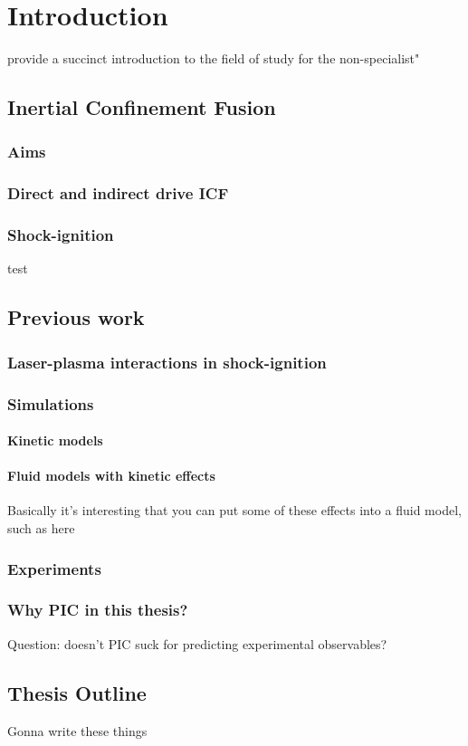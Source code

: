 \chapter{Introduction}
\label{chp:introduction}
provide a succinct introduction to the field of study for the non-specialist"

\section{Inertial Confinement Fusion}
\subsection{Aims}
\subsection{Direct and indirect drive ICF}
\subsection{Shock-ignition}
test\cite{Ribeyre2009}


\section{Previous work}
\subsection{Laser-plasma interactions in shock-ignition}
\subsection{Simulations}
\subsubsection{Kinetic models}
\subsubsection{Fluid models with kinetic effects}
Basically it's interesting that you can put some of these effects into a fluid model, such as here \cite{Tran2020}
\subsection{Experiments}

\subsection{Why PIC in this thesis?}
Question: doesn't PIC suck for predicting experimental observables? 

\section{Thesis Outline}
Gonna write these things

%
%
